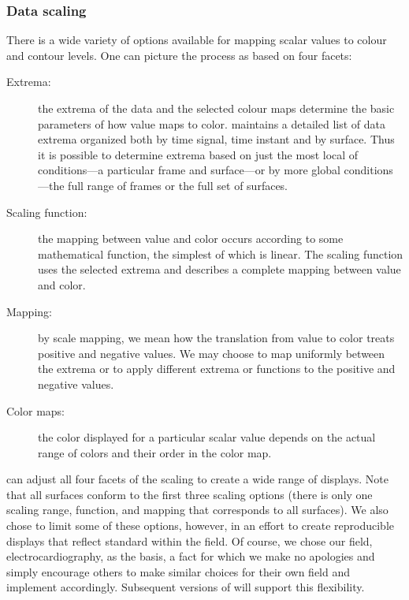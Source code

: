 \subsubsection{Data scaling}
\label{sec:scaling} 

There is a wide variety of options available for mapping scalar values to
colour and contour levels.  One can picture the process as based on four
facets: 

\begin{description}
  \item [Extrema: ] the extrema of the data and the selected colour maps
        determine the basic parameters of how value maps to color.  \map{}
        maintains a detailed list of data extrema organized both by time
        signal, time instant and by surface.  Thus it is possible to determine
        extrema based on just the most local of conditions---a particular
        frame and surface---or by more global conditions---the full range
        of frames or the full set of surfaces.
  \item [Scaling function: ] the mapping between value and color occurs
        according to some mathematical function, the simplest of which
        is linear.   The scaling function uses the selected extrema and
        describes a complete mapping between value and color.
  \item [Mapping: ] by scale mapping, we mean how the translation from
        value to color treats positive and negative values.  We may choose
        to map uniformly between the extrema or to apply different
        extrema or functions to the positive and negative values.
  \item [Color maps: ] the color displayed for a particular scalar value
        depends on the actual range of colors and their order in the color
        map.
\end{description}

\map{} can adjust all four facets of the scaling to create a wide range of
displays.  Note that all surfaces conform to the first three scaling
options (there is only one scaling range, function, and mapping that
corresponds to all surfaces).  We also chose to limit some of these 
options, however, in an effort
to create reproducible displays that reflect standard within the field.  Of
course, we chose our field, electrocardiography, as the basis, a fact for
which we make no apologies and simply encourage others to make similar
choices for their own field and implement \map{} accordingly.  Subsequent
versions of \map{} will support this flexibility.

